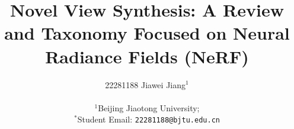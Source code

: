 \documentclass[10pt,twocolumn,letterpaper]{article}
\begin{document}
\title{\LARGE{Novel View Synthesis: A Review and Taxonomy Focused on Neural Radiance Fields (NeRF)}}  \vspace{-10pt}

\author{22281188 Jiawei Jiang{$^{1}$}\\\vspace{-10pt}{\small~}\\
{$^{1}$}Beijing Jiaotong University;\\
{\small{{$^{*}$}Student Email: \tt{22281188@bjtu.edu.cn}}}
}



\maketitle
\thispagestyle{empty}

































{\small


}
\end{document}
